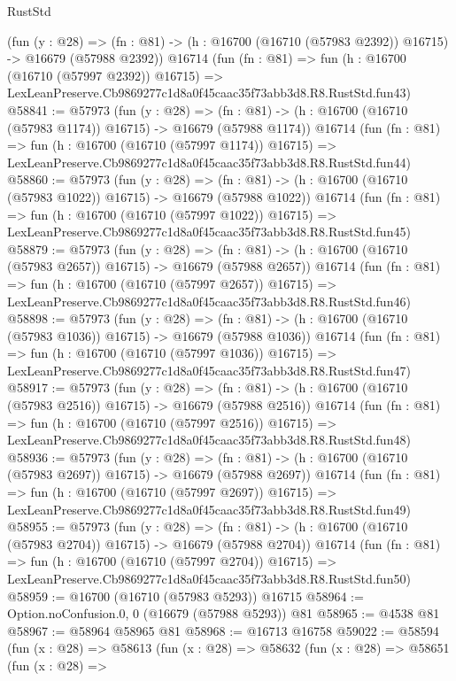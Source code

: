 \begin{lexlean}{RustStd}
\begin{coremodule}
    (fun (y : @28) =>
    (fn : @81) -> (h : @16700 (@16710 (@57983 @2392)) @16715) -> @16679 (@57988 @2392))
    @16714
    (fun (fn : @81) =>
    fun (h : @16700 (@16710 (@57997 @2392)) @16715) =>
    LexLeanPreserve.Cb9869277c1d8a0f45caac35f73abb3d8.R8.RustStd.fun43)
@58841 := @57973
    (fun (y : @28) =>
    (fn : @81) -> (h : @16700 (@16710 (@57983 @1174)) @16715) -> @16679 (@57988 @1174))
    @16714
    (fun (fn : @81) =>
    fun (h : @16700 (@16710 (@57997 @1174)) @16715) =>
    LexLeanPreserve.Cb9869277c1d8a0f45caac35f73abb3d8.R8.RustStd.fun44)
@58860 := @57973
    (fun (y : @28) =>
    (fn : @81) -> (h : @16700 (@16710 (@57983 @1022)) @16715) -> @16679 (@57988 @1022))
    @16714
    (fun (fn : @81) =>
    fun (h : @16700 (@16710 (@57997 @1022)) @16715) =>
    LexLeanPreserve.Cb9869277c1d8a0f45caac35f73abb3d8.R8.RustStd.fun45)
@58879 := @57973
    (fun (y : @28) =>
    (fn : @81) -> (h : @16700 (@16710 (@57983 @2657)) @16715) -> @16679 (@57988 @2657))
    @16714
    (fun (fn : @81) =>
    fun (h : @16700 (@16710 (@57997 @2657)) @16715) =>
    LexLeanPreserve.Cb9869277c1d8a0f45caac35f73abb3d8.R8.RustStd.fun46)
@58898 := @57973
    (fun (y : @28) =>
    (fn : @81) -> (h : @16700 (@16710 (@57983 @1036)) @16715) -> @16679 (@57988 @1036))
    @16714
    (fun (fn : @81) =>
    fun (h : @16700 (@16710 (@57997 @1036)) @16715) =>
    LexLeanPreserve.Cb9869277c1d8a0f45caac35f73abb3d8.R8.RustStd.fun47)
@58917 := @57973
    (fun (y : @28) =>
    (fn : @81) -> (h : @16700 (@16710 (@57983 @2516)) @16715) -> @16679 (@57988 @2516))
    @16714
    (fun (fn : @81) =>
    fun (h : @16700 (@16710 (@57997 @2516)) @16715) =>
    LexLeanPreserve.Cb9869277c1d8a0f45caac35f73abb3d8.R8.RustStd.fun48)
@58936 := @57973
    (fun (y : @28) =>
    (fn : @81) -> (h : @16700 (@16710 (@57983 @2697)) @16715) -> @16679 (@57988 @2697))
    @16714
    (fun (fn : @81) =>
    fun (h : @16700 (@16710 (@57997 @2697)) @16715) =>
    LexLeanPreserve.Cb9869277c1d8a0f45caac35f73abb3d8.R8.RustStd.fun49)
@58955 := @57973
    (fun (y : @28) =>
    (fn : @81) -> (h : @16700 (@16710 (@57983 @2704)) @16715) -> @16679 (@57988 @2704))
    @16714
    (fun (fn : @81) =>
    fun (h : @16700 (@16710 (@57997 @2704)) @16715) =>
    LexLeanPreserve.Cb9869277c1d8a0f45caac35f73abb3d8.R8.RustStd.fun50)
@58959 := @16700 (@16710 (@57983 @5293)) @16715
@58964 := Option.noConfusion.{0, 0} (@16679 (@57988 @5293)) @81
@58965 := @4538 @81
@58967 := @58964 @58965 @81
@58968 := @16713 @16758
@59022 := @58594
    (fun (x : @28) =>
    @58613
      (fun (x : @28) =>
      @58632
        (fun (x : @28) =>
        @58651
          (fun (x : @28) =>

\end{coremodule}
\end{lexlean}
